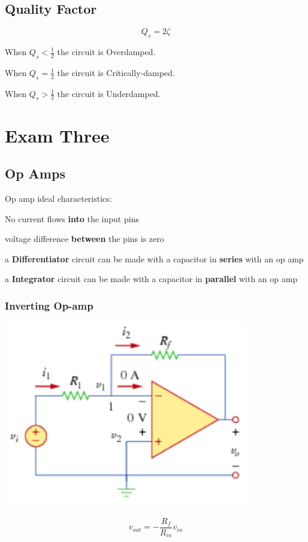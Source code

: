 \documentclass{article}
\begin{document}
\subsection*{Quality Factor}
\begin{equation}
    Q_s = 2 \zeta 
\end{equation}
\begin{center}
    When $Q_s < \frac{1}{2}$ the circuit is Overdamped.
\end{center}
\begin{center}
    When $Q_s = \frac{1}{2}$ the circuit is Critically-damped.
\end{center}
\begin{center}
    When $Q_s > \frac{1}{2}$ the circuit is Underdamped.
\end{center}
\newpage
\section*{Exam Three}
\subsection*{Op Amps}
\begin{center}
    Op amp ideal characteristics:

    No current flows \textbf{into} the input pins
    
    voltage difference \textbf{between} the pins is zero
    \vspace{5mm}
    
    a \textbf{Differentiator} circuit can be made with a capacitor in \textbf{series} with an op amp
    
    a \textbf{Integrator} circuit can be made with a capacitor in \textbf{parallel} with an op amp
\end{center}
\subsubsection*{Inverting Op-amp}
\begin{center}
    \includegraphics[width = .15\textwidth]{inverting.png}
\end{center}
\begin{equation}
    v_{out} = -\frac{R_f}{R_{in}}v_{in}
\end{equation}
\end{document}

